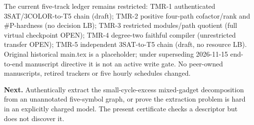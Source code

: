 \documentclass[11pt]{article}
\begin{document}
The current five-track ledger remains restricted: TMR-1 authenticated 3SAT/3COLOR-to-T5 chain (draft); TMR-2 positive four-path cofactor/rank and #P-hardness (no decision LB); TMR-3 restricted modules/path quotient (full virtual checkpoint OPEN); TMR-4 degree-two faithful compiler (unrestricted transfer OPEN); TMR-5 independent 3SAT-to-T5 chain (draft, no resource LB). Original historical main.tex is a placeholder; under superseding 2026-11-15 end-to-end manuscript directive it is not an active write gate. No peer-owned manuscripts, retired trackers or five hourly schedules changed.
\par\noindent\textbf{Next.} Authentically extract the small-cycle-excess mixed-gadget decomposition from an unannotated five-symbol graph, or prove the extraction problem is hard in an explicitly charged model. The present certificate checks a descriptor but does not discover it.
\end{document}
